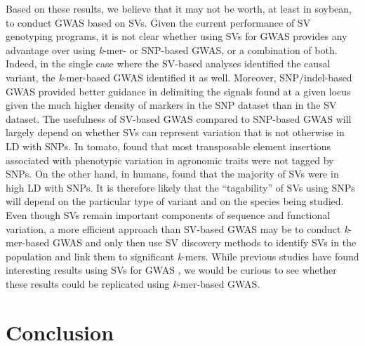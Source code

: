 Based on these results, we believe that it may not be worth, at least in
soybean, to conduct GWAS based on SVs. Given the current performance of SV
genotyping programs, it is not clear whether using SVs for GWAS provides any
advantage over using \emph{k}-mer- or SNP-based GWAS, or a combination of both.
Indeed, in the single case where the SV-based analyses identified the causal
variant, the \emph{k}-mer-based GWAS identified it as well. Moreover,
SNP/indel-based GWAS provided better guidance in delimiting the signals found
at a given locus given the much higher density of markers in the SNP dataset
than in the SV dataset. The usefulness of SV-based GWAS compared to SNP-based
GWAS will largely depend on whether SVs can represent variation that is not
otherwise in LD with SNPs. In tomato, \cite{dominguez2020} found that most
transposable element insertions associated with phenotypic variation in
agronomic traits were not tagged by SNPs. On the other hand, in humans,
\cite{maretty2017} found that the majority of SVs were in high LD with SNPs. It
is therefore likely that the ``tagability'' of SVs using SNPs will depend on
the particular type of variant and on the species being studied. Even though
SVs remain important components of sequence and functional variation, a more
efficient approach than SV-based GWAS may be to conduct \emph{k}-mer-based GWAS
and only then use SV discovery methods to identify SVs in the population and
link them to significant \emph{k}-mers. While previous studies have found
interesting results using SVs for GWAS \citep[e.g.][]{zhang2015, akakpo2020,
dominguez2020}, we would be curious to see whether these results
could be replicated using \emph{k}-mer-based GWAS.

\section{Conclusion}

